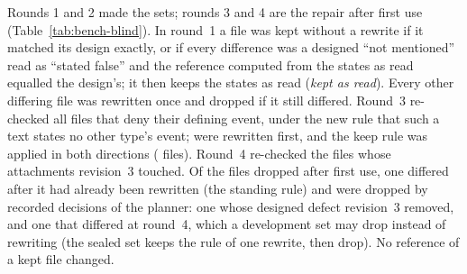 Rounds 1 and 2 made the sets; rounds 3 and 4 are the repair after first use (Table~\ref{tab:bench-blind}). In round~1 a file was kept without a rewrite if it matched its design exactly, or if every difference was a designed ``not mentioned'' read as ``stated false'' and the reference computed from the states as read equalled the design's; it then keeps the states as read (\emph{kept as read}). Every other differing file was rewritten once and dropped if it still differed. Round~3 re-checked all \sfourdevAllThreeChecked{} files that deny their defining event, under the new rule that such a text states no other type's event; \sfourdevAllRepairRewritten{} were rewritten first, and the keep rule was applied in both directions (\sfourdevAllThreeKeepRule{} files). Round~4 re-checked the \sfourdevAllFourChecked{} files whose attachments revision~3 touched. Of the \sfourdevAllDroppedAfterUse{} files dropped after first use, one differed after it had already been rewritten (the standing rule) and \sfourdevAllDroppedPlanner{} were dropped by recorded decisions of the planner: one whose designed defect revision~3 removed, and one that differed at round~4, which a development set may drop instead of rewriting (the sealed set keeps the rule of one rewrite, then drop). No reference of a kept file changed.

